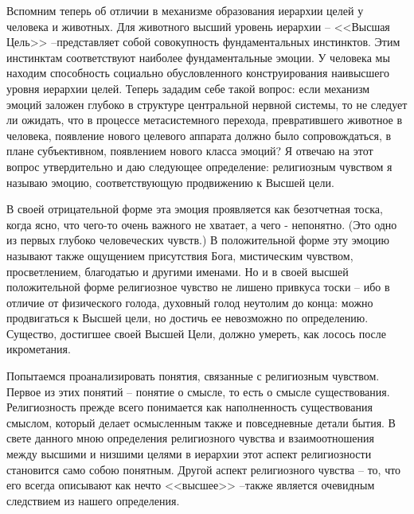 \documentclass{book}
\begin{document}
Вспомним теперь об отличии в механизме образования иерархии целей у человека и животных. Для животного высший уро­вень иерархии -- <<Высшая Цель>> --представляет собой совокуп­ность фундаментальных инстинктов. Этим инстинктам соот­ветствуют наиболее фундаментальные эмоции. У человека мы находим способность социально обусловленного конструиро­вания наивысшего уровня иерархии целей. Теперь зададим се­бе такой вопрос: если механизм эмоций заложен глубоко в структуре центральной нервной системы, то не следует ли ожи­дать, что в процессе метасистемного перехода, превратившего животное в человека, появление нового целевого аппарата должно было сопровождаться, в плане субъективном, появле­нием нового класса эмоций?
Я отвечаю на этот вопрос утвердительно и даю следующее определение: религиозным чувством я называю эмоцию, соот­ветствующую продвижению к Высшей цели.

В своей отрицательной форме эта эмоция проявляется как безотчетная тоска, когда ясно, что чего-то очень важного не хва­тает, а чего - непонятно. (Это одно из первых глубоко челове­ческих чувств.) В положительной форме эту эмоцию называют также ощущением присутствия Бога, мистическим чувством, просветлением, благодатью и другими именами. Но и в своей высшей положительной форме религиозное чувство не лишено привкуса тоски -- ибо в отличие от физического голода, духов­ный голод неутолим до конца: можно продвигаться к Высшей цели, но достичь ее невозможно по определению. Существо, достигшее своей Высшей Цели, должно умереть, как лосось пос­ле икрометания.

Попытаемся проанализировать понятия, связанные с рели­гиозным чувством. Первое из этих понятий -- понятие о смысле, то есть о смысле существования. Религиозность прежде всего понимается как наполненность существования смыслом, кото­рый делает осмысленным также и повседневные детали бытия. В свете данного мною определения религиозного чувства и взаимоотношения между высшими и низшими целями в иерар­хии этот аспект религиозности становится само собою понят­ным. Другой аспект религиозного чувства -- то, что его всегда описывают как нечто <<высшее>> --также является очевидным следствием из нашего определения.
\end{document}
